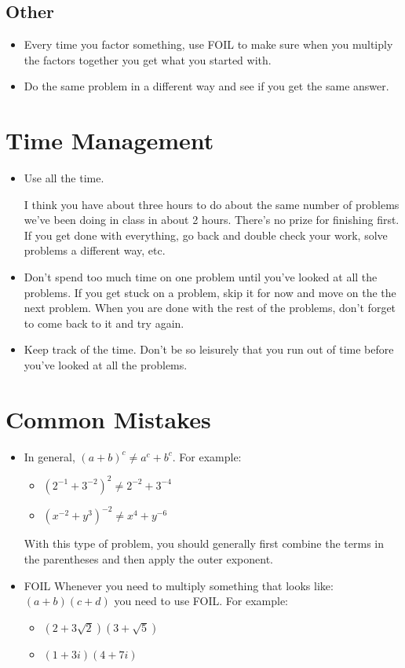 \documentclass{article}
\begin{document}
\subsection{Other}
\begin{itemize}
  \item Every time you factor something, use FOIL to make sure when you multiply the factors together you get what you
    started with.
  \item Do the same problem in a different way and see if you get the same answer.
\end{itemize}

\section{Time Management}
\begin{itemize}
\item
Use all the time.  

I think you have about three hours to do about the same number of problems we've been doing in class
in about 2 hours.  There's no prize for finishing first.  If you get done with everything, go back and double check
your work, solve problems a different way, etc.  

\item
Don't spend too much time on one problem until you've looked at all the problems.  If you get stuck on a problem, skip
it for now and move on the the next problem.  When you are done with the rest of the problems, don't forget to come
back to it and try again.

\item
Keep track of the time.  Don't be so leisurely that you run out of time before you've looked at all the problems.

\end{itemize}

\section{Common Mistakes}

\begin{itemize}
  \item In general, $(a+b)^c \ne a^c + b^c$.  For example:
    \begin{itemize}
      \item $(2^{-1} + 3^{-2})^2 \ne 2^{-2} + 3^{-4}$
      \item $(x^{-2} + y^{3})^{-2} \ne x^4 + y^{-6}$
    \end{itemize}
With this type of problem, you should generally first combine the terms in the parentheses and then apply the outer
exponent.

\item FOIL
  Whenever you need to multiply something that looks like: $(a+b)(c+d)$ you need to use FOIL.  For example:
  \begin{itemize}
    \item $(2 + 3\sqrt{2})(3 + \sqrt{5})$
    \item $(1 + 3i)(4 + 7i)$
  \end{itemize}

\end{itemize}
\end{document}
